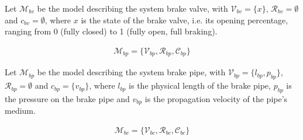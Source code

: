 \noindent
Let ${\mathcal {M}}_{bv}$ be the model describing the system brake valve, with ${\mathcal {V}}_{bv} = \{x\}$, ${\mathcal {R}}_{bv} = \emptyset$ and $c_{bv} = \emptyset$, where $x$ is the state of the brake valve, i.e. its opening percentage, ranging from 0 (fully closed) to 1 (fully open, full braking).

\begin{align*}
{\mathcal {M}}_{bp} = \{ {\mathcal {V}}_{bp}, {\mathcal {R}}_{bp}, {\mathcal {C}}_{bp} \}
\end{align*}

\noindent
Let ${\mathcal {M}}_{bp}$ be the model describing the system brake pipe, with ${\mathcal {V}}_{bp} = \{ l_{bp}, p_{bp} \}$, ${\mathcal {R}}_{bp} = \emptyset$ and $c_{bp} = \{ v_{bp} \}$, where $l_{bp}$ is the physical length of the brake pipe, $p_{bp}$ is the pressure on the brake pipe and $v_{bp}$ is the propagation velocity of the pipe's medium. 

\begin{align*}
{\mathcal {M}}_{bc} = \{ {\mathcal {V}}_{bc}, {\mathcal {R}}_{bc}, {\mathcal {C}}_{bc} \}
\end{align*}

